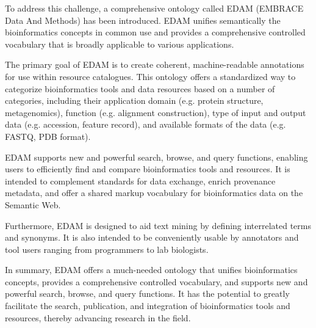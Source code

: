 \documentclass{scrartcl}
\begin{document}
To address this challenge, a comprehensive ontology called EDAM \cite{edam} (EMBRACE Data And Methods) has been introduced. 
  EDAM unifies semantically the bioinformatics concepts in common use and provides a comprehensive controlled 
  vocabulary that is broadly applicable to various applications.

The primary goal of EDAM is to create coherent, machine-readable annotations for use within resource catalogues. 
  This ontology offers a standardized way to categorize bioinformatics tools and data resources based on a 
  number of categories, including their application domain (e.g. protein structure, metagenomics), 
  function (e.g. alignment construction), type of input and output data (e.g. accession, feature record), 
  and available formats of the data (e.g. FASTQ, PDB format).

EDAM supports new and powerful search, browse, and query functions, enabling users to efficiently find and 
  compare bioinformatics tools and resources. It is intended to complement standards for data exchange, 
  enrich provenance metadata, and offer a shared markup vocabulary for bioinformatics data on the Semantic Web.

Furthermore, EDAM is designed to aid text mining by defining interrelated terms and synonyms. 
  It is also intended to be conveniently usable by annotators and tool users ranging from programmers to 
  lab biologists.

In summary, EDAM offers a much-needed ontology that unifies bioinformatics concepts, provides a comprehensive 
  controlled vocabulary, and supports new and powerful search, browse, and query functions. It has the potential 
  to greatly facilitate the search, publication, and integration of bioinformatics tools and resources, 
  thereby advancing research in the field.
\end{document}

